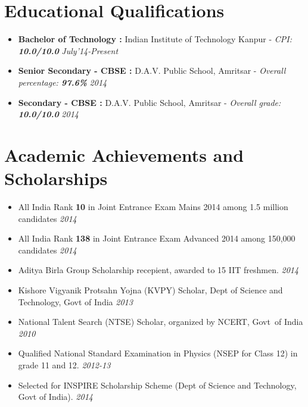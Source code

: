\documentclass[11pt,a4paper]{moderncv}
\newcommand{\education}[5]{
\item[] \textbf{\large{#1 :}} #2 - \emph{#3: \textbf{#4}} \hfill\textit{#5}
}
\begin{document}
\maketitle
\vspace{-1cm}
\section*{Educational Qualifications}
\begin{itemize}
  \setlength\itemsep{0.2cm}
  \education{Bachelor of Technology}{Indian Institute of Technology Kanpur}{CPI}{10.0/10.0}{July'14-Present}
  \education{Senior Secondary - CBSE}{D.A.V. Public School, Amritsar}{Overall percentage}{97.6\%}{2014}
  \education{Secondary - CBSE}{D.A.V. Public School, Amritsar}{Overall grade}{10.0/10.0}{2014}
\end{itemize}

\vspace{-0.1cm}
\section*{Academic Achievements and Scholarships}
\begin{itemize}
  \setlength\itemsep{0.5em}
  \item All India Rank \textbf{10} in Joint Entrance Exam Mains 2014 among 1.5 million candidates              \hfill \textit{2014}
  \item All India Rank \textbf{138} in Joint Entrance Exam Advanced 2014 among 150,000 candidates            	\hfill \textit{2014}
  \item Aditya Birla Group Scholarship recepient, awarded to 15 IIT freshmen.                        \hfill \textit{2014}
  \item Kishore Vigyanik Protsahn Yojna (KVPY) Scholar, Dept of Science and Technology, Govt of India
    \hfill \textit{2013}
  \item National Talent Search (NTSE) Scholar, organized by NCERT, Govt\ of India
    \hfill \textit{2010}
  \item Qualified National Standard Examination in Physics (NSEP for Class 12) in grade 11 and 12. \hfill \textit{2012-13}
  \item Selected for INSPIRE Scholarship Scheme (Dept of Science and Technology, Govt of India).
    \hfill \textit{2014}

\end{itemize}

\vspace{-0.1cm}
\end{document}
